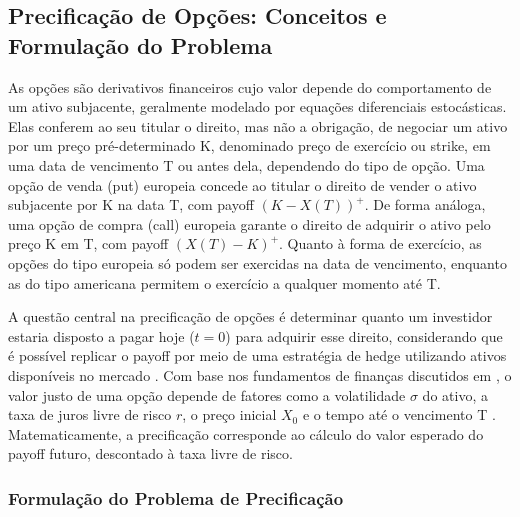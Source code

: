 \documentclass[12pt,openright,oneside,a4paper]{abntex2}
\numberwithin{equation}{section}
\begin{document}
\subsection{Precificação de Opções: Conceitos e Formulação do Problema}


As opções são derivativos financeiros cujo valor depende do comportamento de um ativo subjacente, geralmente modelado por equações diferenciais estocásticas. Elas conferem ao seu titular o direito, mas não a obrigação, de negociar um ativo por um preço pré-determinado K, denominado preço de exercício ou strike, em uma data de vencimento T ou antes dela, dependendo do tipo de opção. Uma opção de venda (put) europeia concede ao titular o direito de vender o ativo subjacente por K na data T, com payoff \( (K - X(T))^{+} \). De forma análoga, uma opção de compra (call) europeia garante o direito de adquirir o ativo pelo preço K em T, com payoff \( (X(T) - K)^{+} \). Quanto à forma de exercício, as opções do tipo europeia só podem ser exercidas na data de vencimento, enquanto as do tipo americana permitem o exercício a qualquer momento até T.


A questão central na precificação de opções é determinar quanto um investidor estaria disposto a pagar hoje (\( t = 0 \)) para adquirir esse direito, considerando que é possível replicar o payoff por meio de uma estratégia de hedge utilizando ativos disponíveis no mercado \parencite[p.~170]{Mikosh}. Com base nos fundamentos de finanças discutidos em \textcite{Hull}, o valor justo de uma opção depende de fatores como a volatilidade \( \sigma \) do ativo, a taxa de juros livre de risco \( r \), o preço inicial \( X_0 \) e o tempo até o vencimento  T . Matematicamente, a precificação corresponde ao cálculo do valor esperado do payoff futuro, descontado à taxa livre de risco.


\subsubsection{Formulação do Problema de Precificação}
\end{document}
